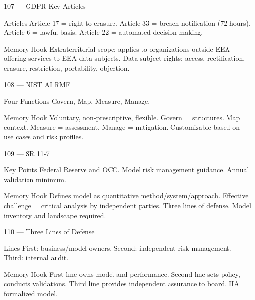 \documentclass[aspectratio=169,8pt]{beamer}
\begin{document}
	\begin{frame}{107 --- GDPR Key Articles}
		\begin{block}{Articles}
			Article 17 = right to erasure. Article 33 = breach notification (72 hours). Article 6 = lawful basis. Article 22 = automated decision-making.
		\end{block}
		\begin{block}{Memory Hook}
			Extraterritorial scope: applies to organizations outside EEA offering services to EEA data subjects. Data subject rights: access, rectification, erasure, restriction, portability, objection.
		\end{block}
	\end{frame}
	
	\begin{frame}{108 --- NIST AI RMF}
		\begin{block}{Four Functions}
			Govern, Map, Measure, Manage.
		\end{block}
		\begin{block}{Memory Hook}
			Voluntary, non-prescriptive, flexible. Govern = structures. Map = context. Measure = assessment. Manage = mitigation. Customizable based on use cases and risk profiles.
		\end{block}
	\end{frame}
	
	\begin{frame}{109 --- SR 11-7}
		\begin{block}{Key Points}
			Federal Reserve and OCC. Model risk management guidance. Annual validation minimum.
		\end{block}
		\begin{block}{Memory Hook}
			Defines model as quantitative method/system/approach. Effective challenge = critical analysis by independent parties. Three lines of defense. Model inventory and landscape required.
		\end{block}
	\end{frame}
	
	\begin{frame}{110 --- Three Lines of Defense}
		\begin{block}{Lines}
			First: business/model owners. Second: independent risk management. Third: internal audit.
		\end{block}
		\begin{block}{Memory Hook}
			First line owns model and performance. Second line sets policy, conducts validations. Third line provides independent assurance to board. IIA formalized model.
		\end{block}
	\end{frame}
	
\end{document}
